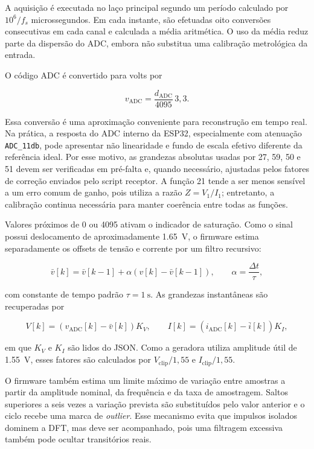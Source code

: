 A aquisição é executada no laço principal segundo um período calculado por $10^6/f_s$ microssegundos. Em cada instante, são efetuadas oito conversões consecutivas em cada canal e calculada a média aritmética. O uso da média reduz parte da dispersão do ADC, embora não substitua uma calibração metrológica da entrada.

O código ADC é convertido para volts por

\begin{equation}
  v_{\mathrm{ADC}}=\frac{d_{\mathrm{ADC}}}{4095}\,3{,}3.
\end{equation}

Essa conversão é uma aproximação conveniente para reconstrução em tempo real. Na prática, a resposta do ADC interno da ESP32, especialmente com atenuação \texttt{ADC\_11db}, pode apresentar não linearidade e fundo de escala efetivo diferente da referência ideal. Por esse motivo, as grandezas absolutas usadas por 27, 59, 50 e 51 devem ser verificadas em pré-falta e, quando necessário, ajustadas pelos fatores de correção enviados pelo script receptor. A função 21 tende a ser menos sensível a um erro comum de ganho, pois utiliza a razão $Z=V_1/I_1$; entretanto, a calibração continua necessária para manter coerência entre todas as funções.

Valores próximos de 0 ou 4095 ativam o indicador de saturação. Como o sinal possui deslocamento de aproximadamente \SI{1,65}{\volt}, o firmware estima separadamente os offsets de tensão e corrente por um filtro recursivo:

\begin{equation}
  \bar{v}[k]=\bar{v}[k-1]+\alpha\left(v[k]-\bar{v}[k-1]\right),
  \qquad \alpha=\frac{\Delta t}{\tau},
  \label{eq:filtro-offset}
\end{equation}

com constante de tempo padrão $\tau=\SI{1}{\second}$. As grandezas instantâneas são recuperadas por

\begin{equation}
  V[k]=(v_{\mathrm{ADC}}[k]-\bar{v}[k])K_V, \qquad
  I[k]=(i_{\mathrm{ADC}}[k]-\bar{i}[k])K_I,
  \label{eq:reconstrucao-engenharia}
\end{equation}

em que $K_V$ e $K_I$ são lidos do JSON. Como a geradora utiliza amplitude útil de \SI{1,55}{\volt}, esses fatores são calculados por $V_{\mathrm{clip}}/1{,}55$ e $I_{\mathrm{clip}}/1{,}55$.

O firmware também estima um limite máximo de variação entre amostras a partir da amplitude nominal, da frequência e da taxa de amostragem. Saltos superiores a seis vezes a variação prevista são substituídos pelo valor anterior e o ciclo recebe uma marca de \textit{outlier}. Esse mecanismo evita que impulsos isolados dominem a DFT, mas deve ser acompanhado, pois uma filtragem excessiva também pode ocultar transitórios reais.

